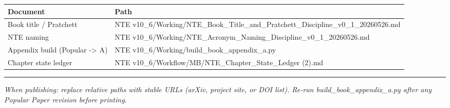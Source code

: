 \documentclass[
  11pt,
]{article}
\newcounter{none} %
\begin{document}
{\def\LTcaptype{none} %
\begin{longtable}[]{@{}
  >{\raggedright\arraybackslash}p{}
  >{\raggedright\arraybackslash}p{}@{}}
\toprule\noalign{}
\begin{minipage}[b]{\linewidth}\raggedright
Document
\end{minipage} & \begin{minipage}[b]{\linewidth}\raggedright
Path
\end{minipage} \\
\midrule\noalign{}
\endhead
\bottomrule\noalign{}
\endlastfoot
Book title / Pratchett & NTE
v10\_6/Working/NTE\_Book\_Title\_and\_\newline Pratchett\_Discipline\_v0\_1\_20260526.md \\
NTE naming & NTE
v10\_6/Working/NTE\_Acronym\_Naming\_\newline Discipline\_v0\_1\_20260526.md \\
Appendix build (Popular -\textgreater{} A) & NTE
v10\_6/Working/build\_book\_appendix\_a.py \\
Chapter state ledger & NTE
v10\_6/Workflow/MB/NTE\_Chapter\_State\_Ledger (2).md \\
\end{longtable}
}

\begin{center}\rule{0.5\linewidth}{0.5pt}\end{center}

\emph{When publishing: replace relative paths with stable URLs (arXiv,
project site, or DOI list). Re-run build\_book\_appendix\_a.py after any
Popular Paper revision before printing.}
\end{document}
